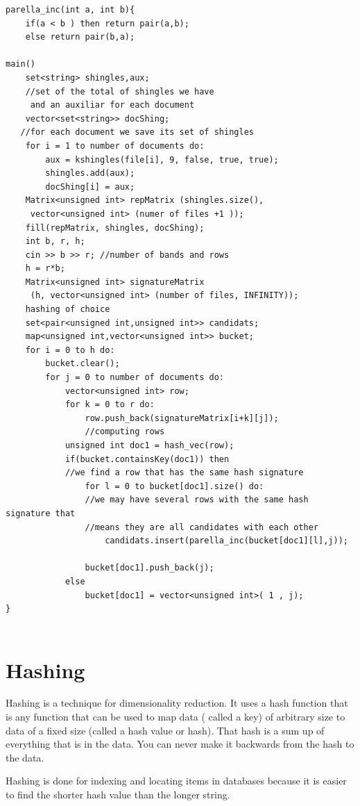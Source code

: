 \documentclass[12pt]{article}
\begin{document}
\begin{lstlisting}
parella_inc(int a, int b){
	if(a < b ) then return pair(a,b);
	else return pair(b,a);

main()
    set<string> shingles,aux;	
    //set of the total of shingles we have
     and an auxiliar for each document
    vector<set<string>> docShing; 
   //for each document we save its set of shingles
    for i = 1 to number of documents do:
        aux = kshingles(file[i], 9, false, true, true);
        shingles.add(aux);
        docShing[i] = aux;
    Matrix<unsigned int> repMatrix (shingles.size(),
     vector<unsigned int> (numer of files +1 ));
    fill(repMatrix, shingles, docShing);
    int b, r, h;
    cin >> b >> r; //number of bands and rows
    h = r*b;
    Matrix<unsigned int> signatureMatrix
     (h, vector<unsigned int> (number of files, INFINITY));
    hashing of choice
    set<pair<unsigned int,unsigned int>> candidats;                     
    map<unsigned int,vector<unsigned int>> bucket;
    for i = 0 to h do:
        bucket.clear();
        for j = 0 to number of documents do:
            vector<unsigned int> row;
            for k = 0 to r do:
                row.push_back(signatureMatrix[i+k][j]);
                //computing rows
            unsigned int doc1 = hash_vec(row);
			if(bucket.containsKey(doc1)) then
			//we find a row that has the same hash signature
				for l = 0 to bucket[doc1].size() do: 
				//we may have several rows with the same hash signature that 
				//means they are all candidates with each other
					candidats.insert(parella_inc(bucket[doc1][l],j));
				           
            	bucket[doc1].push_back(j);
            else 
            	bucket[doc1] = vector<unsigned int>( 1 , j);
}
 
 \end{lstlisting}
 
\section{Hashing}

Hashing is a technique for dimensionality reduction. It uses a hash function that is any function that can be used to map data ( called a key) of arbitrary size to data of a fixed size (called a hash value or hash). That hash is a sum up of everything that is in the data. You can never make it backwards from the hash to the data.

Hashing is done for indexing and locating items in databases because it is easier to find the shorter hash value than the longer string.
\end{document}
